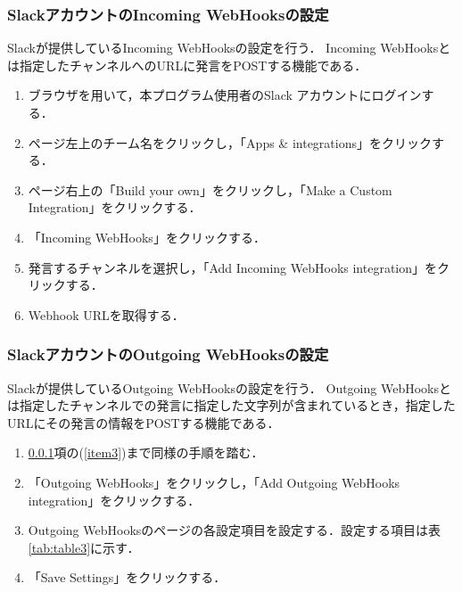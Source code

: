 \documentclass[fleqn, 14pt]{extarticlej}
\begin{document}
\subsubsection{SlackアカウントのIncoming WebHooksの設定}
\label{ss:in}
Slackが提供しているIncoming WebHooksの設定を行う．
Incoming WebHooksとは指定したチャンネルへのURLに発言をPOSTする機能である．
\begin{enumerate}
\item ブラウザを用いて，本プログラム使用者のSlack アカウントにログインする．
\item ページ左上のチーム名をクリックし，「Apps \& integrations」をクリックする．
\item \label{item3}ページ右上の「Build your own」をクリックし，「Make a Custom Integration」をクリックする．
\item 「Incoming WebHooks」をクリックする．
\item 発言するチャンネルを選択し，「Add Incoming WebHooks integration」をクリックする．
\item \label{item4}Webhook URLを取得する． 
\end{enumerate}


\subsubsection{SlackアカウントのOutgoing WebHooksの設定}
\label{ss:out}
Slackが提供しているOutgoing WebHooksの設定を行う．
Outgoing WebHooksとは指定したチャンネルでの発言に指定した文字列が含まれているとき，指定したURLにその発言の情報をPOSTする機能である．
\begin{enumerate}
\item \ref{ss:in}項の(\ref{item3})まで同様の手順を踏む．
\item 「Outgoing WebHooks」をクリックし，「Add Outgoing WebHooks integration」をクリックする．
\item Outgoing WebHooksのページの各設定項目を設定する．設定する項目は表\ref{tab:table3}に示す．
\item「Save Settings」をクリックする．

\end{enumerate}

\begin{table}[bt]
  \begin{center}
    \caption{Outgoing WebHooksの設定項目} 
    \label{tab:table3}
    \vspace{0.3cm}
  \end{center}
\end{table}
\end{document}
